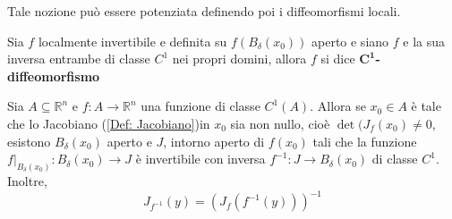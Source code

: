 Tale nozione può essere potenziata definendo poi i diffeomorfismi locali.
\begin{definition} \label{Def: Diffeomorfismo}
    Sia $f$ localmente invertibile e definita su $f(B_\delta(x_0))$ aperto e siano $f$ e la sua inversa entrambe di classe $C^1$ nei propri domini, allora $f$ si dice $\mathbf{C^1}$\textbf{-diffeomorfismo}
\end{definition}
\begin{theorem} \label{Teo: Invertibilità locale}
    Sia $A \subseteq \mathbb{R}^n$ e $f: A \to \mathbb{R}^n$ una funzione di classe $C^1(A)$. Allora se $x_0 \in A$ è tale che lo Jacobiano (\ref{Def: Jacobiano})in $x_0$ sia non nullo, cioè $\det(J_f(x_0) \neq 0$, esistono $B_\delta(x_0)$ aperto e $J$, intorno aperto di $f(x_0)$ tali che la funzione $f\big|_{B_\delta(x_0)}: B_\delta(x_0) \to J$ è invertibile con inversa $f^{-1}: J \to B_\delta(x_0)$ di classe $C^1$. Inoltre, 
    \begin{equation}
        J_{f^{-1}}(y)=(J_f(f^{-1}(y)))^{-1}
    \end{equation}
\end{theorem}
